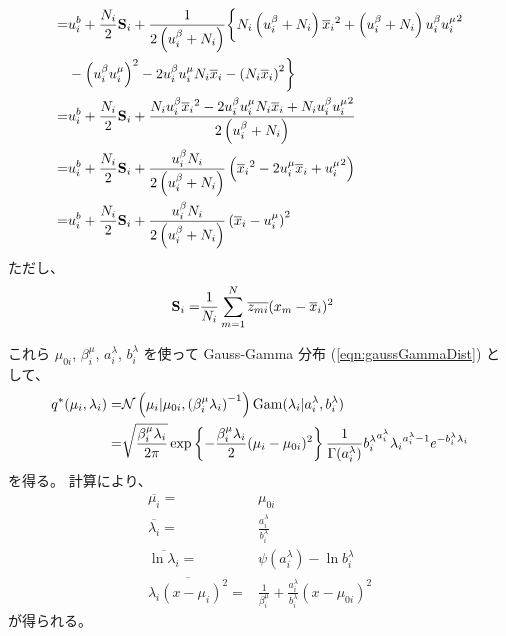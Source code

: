 \begin{align}
%
  =&  u_i^b + \frac{N_i}{2} {\bf S}_i  +  \frac{1}{ 2 \left( u_i^\beta + N_i \right) }  \biggl\{
      N_i \left( u_i^\beta + N_i \right) {\overline{x}_i}^2  
      + \left( u_i^\beta + N_i \right) u_i^\beta {u_i^\mu}^2  \notag  \\  
    &  - \left( u_i^\beta u_i^\mu \right)^2 - 2 u_i^\beta u_i^\mu N_i \overline{x}_i - \left( N_i \overline{x}_i \right)^2  \biggr\}  \\
%
  =&  u_i^b + \frac{N_i}{2} {\bf S}_i   
    + \frac{  N_i u_i^\beta {\overline{x}_i}^2 - 2 u_i^\beta u_i^\mu N_i \overline{x}_i + N_i u_i^\beta {u_i^\mu}^2 }{ 2 \left( u_i^\beta + N_i \right) }  \\
%
  =&  u_i^b + \frac{N_i}{2} {\bf S}_i   
    + \frac{ u_i^\beta N_i }{ 2 \left( u_i^\beta + N_i \right) }  
      \left( {\overline{x}_i}^2 - 2 u_i^\mu \overline{x}_i + {u_i^\mu}^2 \right)  \\
%
  =&  u_i^b + \frac{N_i}{2} {\bf S}_i   
    + \frac{ u_i^\beta N_i }{ 2 \left( u_i^\beta + N_i \right) }  
      \left( {\overline{x}_i} - u_i^\mu \right)^2
\end{align}
ただし、
\begin{align}
  {\bf S}_i  =&  \frac{1}{N_i} \sum_{m=1}^N \overline{z_{mi}} (x_m - \overline{x}_i)^2
\end{align}

これら $\mu_{0i}$, $\beta_i^\mu$, $a_i^\lambda$, $b_i^\lambda$ を使って Gauss-Gamma 分布 (\ref{eqn:gaussGammaDist}) として、
\begin{align}
  q^*( \mu_i, \lambda_i )  =&  \mathcal{N}\left( \mu_i | \mu_{0i}, \left(\beta_i^\mu {\lambda_i} \right)^{-1} \right) {\rm Gam}(\lambda_i | a_i^\lambda, b_i^\lambda) \\
  =&  \sqrt{ \frac{ \beta_i^\mu \lambda_i }{ 2 \pi }} \exp\left\{ - \frac{\beta_i^\mu \lambda_i}{2} (\mu_i - \mu_{0i})^2 \right\} \frac{ 1 }{ \Gamma(a_i^\lambda) } {b_i^\lambda}^{a_i^\lambda} {\lambda_i}^{a_i^\lambda - 1} e^{-b_i^\lambda \lambda_i}
\end{align}
を得る。
計算により、
\begin{align}
  \overline{\mu_i}  =&  \mu_{0i}  \\
  \overline{\lambda_i}  =&  \frac{a_i^\lambda}{b_i^\lambda}  \\
  \overline{\ln \lambda_i}  =&  \psi(a_i^\lambda) - \ln b_i^\lambda  \\
  \overline{\lambda_i (x - {\mu_i})^2}  =&  \frac{1}{\beta_i^\mu} + \frac{a_i^\lambda}{b_i^\lambda} (x - \mu_{0i})^2
\end{align}
が得られる。


